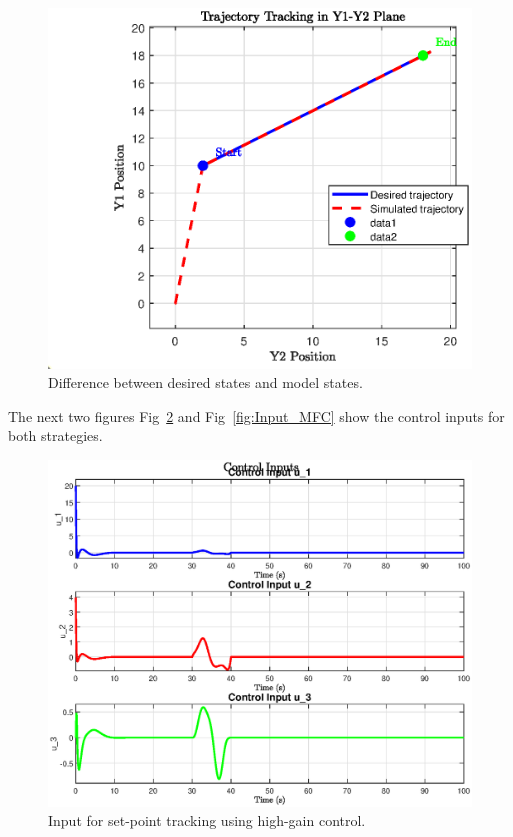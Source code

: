 \begin{figure}[htbp]
    \centering
    \includegraphics[width=0.8\linewidth]{imgs/section1/XYTrajectory.eps}
    \caption{Difference between desired states and model states.}
    \label{fig:XY_Trajectory}
\end{figure}

The next two figures Fig~\ref{fig:Input_High_Gain} and Fig~\ref{fig:Input_MFC} show the control inputs for 
both strategies.

\begin{figure}[htbp]
    \centering
    \includegraphics[width=0.8\linewidth]{imgs/section1/u_HG.eps}
    \caption{Input for set-point tracking using high-gain control.}
    \label{fig:Input_High_Gain}
\end{figure}

